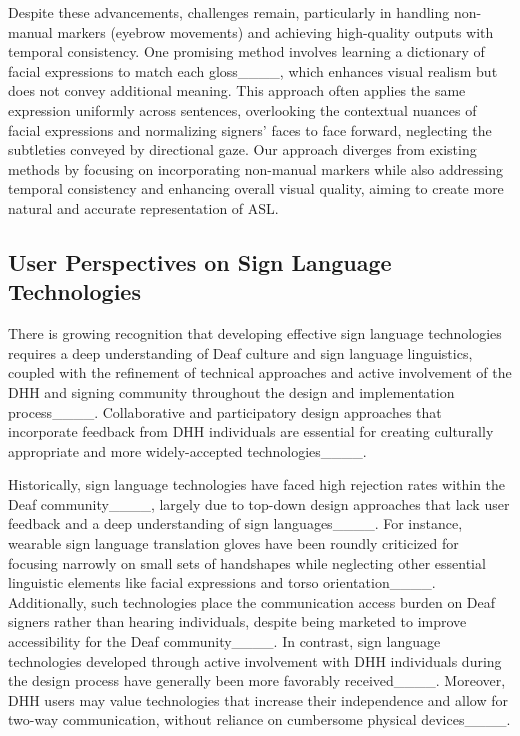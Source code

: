 Despite these advancements, challenges remain, particularly in handling non-manual markers (\eg eyebrow movements) and achieving high-quality outputs with temporal consistency. One promising method involves learning a dictionary of facial expressions to match each gloss____, which enhances visual realism but does not convey additional meaning. This approach often applies the same expression uniformly across sentences, overlooking the contextual nuances of facial expressions and normalizing signers’ faces to face forward, neglecting the subtleties conveyed by directional gaze. Our approach diverges from existing methods by focusing on incorporating non-manual markers while also addressing temporal consistency and enhancing overall visual quality, aiming to create more natural and accurate representation of ASL.

\subsection{User Perspectives on Sign Language Technologies}\label{subsec:rw_user_perspectives}

There is growing recognition that developing effective sign language technologies requires a deep understanding of Deaf culture and sign language linguistics, coupled with the refinement of technical approaches and active involvement of the DHH and signing community throughout the design and implementation process____. Collaborative and participatory design approaches that incorporate feedback from DHH individuals are essential for creating culturally appropriate and more widely-accepted technologies____.

Historically, sign language technologies have faced high rejection rates within the Deaf community____, largely due to top-down design approaches that lack user feedback and a deep understanding of sign languages____. For instance, wearable sign language translation gloves have been roundly criticized for focusing narrowly on small sets of handshapes while neglecting other essential linguistic elements like facial expressions and torso orientation____. Additionally, such technologies place the communication access burden on Deaf signers rather than hearing individuals, despite being marketed to improve accessibility for the Deaf community____. In contrast, sign language technologies developed through active involvement with DHH individuals during the design process have generally been more favorably received____. Moreover, DHH users may value technologies that increase their independence and allow for two-way communication, without reliance on cumbersome physical devices____.

